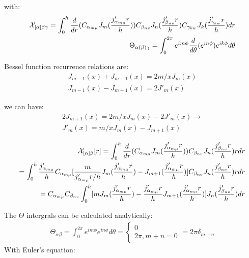 \documentclass{Note}
\begin{document}
with:
\begin{equation}
\begin{aligned}
\mathcal{X}_{[\alpha]\beta\gamma}=\int_0^h {d\over dr}(C_{\alpha_{m\mu}} J_m({j'_{\alpha_{m\mu}}r\over h}))C_{\beta_{nv}} J_n({j'_{\beta_{nv}}r\over h})C_{\gamma_{kw}} J_k({j'_{\gamma_{kw}}r\over h})dr\\
\Theta_{\alpha(\beta)\gamma}=\int_0^{2\pi} e^{im\phi} {d\over d\theta} (e^{in\phi}) e^{ik\phi} d\theta
\end{aligned}
\end{equation}


Bessel function recurrence relations are:
\begin{equation}
\begin{aligned}
J_{m-1}(x)+J_{m+1}(x)=2m/x J_m(x)\\
J_{m-1}(x)-J_{m+1}(x)=2J'_m(x)
\end{aligned}
\end{equation}

we can have:
\begin{equation}
\begin{aligned}
2J_{m+1}(x)=2m/x J_m(x)-2J'_m(x)\rightarrow \\
J'_m(x)=m/x J_m(x)-J_{m+1}(x)
\end{aligned}
\end{equation}

\begin{equation}
\begin{aligned}
\mathcal{X}_{[\alpha]\beta}[r]=\int_0^h {d\over dr}(C_{\alpha_{m\mu}} J_m({j'_{\alpha_{m\mu}}r\over h}))C_{\beta_{nv}} J_n({j'_{\beta_{nv}}r\over h})r dr\\
=\int_0^h {j'_{\alpha_{m\mu}}\over h} C_{\alpha_{m\mu}} [{m\over {j'_{\alpha_{m\mu}}r/ h}} J_m({j'_{\alpha_{m\mu}}r\over h})- J_{m+1}({j'_{\alpha_{m\mu}}r\over h})]C_{\beta_{nv}} J_n({j'_{\beta_{nv}}r\over h})r dr\\
=C_{\alpha_{m\mu}}C_{\beta_{nv}} \int_0^h[{m} J_m({j'_{\alpha_{m\mu}}r\over h})-{j'_{\alpha_{m\mu}}r\over h} J_{m+1}({j'_{\alpha_{m\mu}}r\over h})] J_n({j'_{\beta_{nv}}r\over h})dr\\
\end{aligned}
\end{equation}

The $\Theta$ intergrals can be calculated analytically:
\begin{equation}
\begin{aligned}
\Theta_{\alpha\beta}=\int_0^{2\pi} e^{im\phi} e^{in\phi} d\theta=\left\{\begin{matrix}
0\\
2\pi, m+n=0
\end{matrix}\right.
=2\pi \delta_{m,-n}
\end{aligned}
\end{equation}
With Euler's equation:
\end{document}
